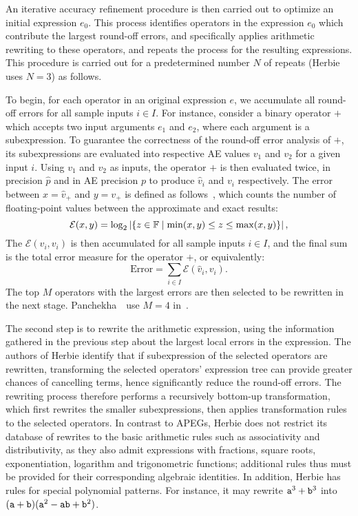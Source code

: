 An iterative accuracy refinement procedure is then carried out to optimize an
initial expression $e_0$.  This process identifies operators in the expression
$e_0$ which contribute the largest round-off errors, and specifically applies
arithmetic rewriting to these operators, and repeats the process for the
resulting expressions.  This procedure is carried out for a predetermined
number $N$ of repeats (Herbie uses $N = 3$) as follows.

To begin, for each operator in an original expression $e$, we accumulate all
round-off errors for all sample inputs $i \in I$.  For instance, consider
a binary operator $+$ which accepts two input arguments $e_1$ and $e_2$,
where each argument is a subexpression.  To guarantee the correctness of
the round-off error analysis of $+$, its subexpressions are evaluated
into respective AE values $v_1$ and $v_2$ for a given input $i$.  Using
$v_1$ and $v_2$ as inputs, the operator $+$ is then evaluated twice,
in precision $\hat{p}$ and in AE precision $p$ to produce $\hat{v}_i$
and $v_i$ respectively.  The error between $x = \hat{v}_+$ and $y =
v_+$ is defined as follows~\cite{panchekha15, schkufza14}, which counts
the number of floating-point values between the approximate and exact
results\footnotemark[4]:
\begin{equation}
    \mathcal{E}(x, y) = \log_2 \left| \left\{
        z \in \mathbb{F} \mid \min(x, y) \leq z \leq \max(x, y)
    \right\} \right|,
\end{equation}
The $\mathcal{E}(\hat{v}_i, v_i)$ is then accumulated for all sample inputs $i
\in I$, and the final sum is the total error measure for the operator $+$, or
equivalently:
\begin{equation}
    \mathrm{Error} = \sum_{i \in I} \mathcal{E}(\hat{v}_i, v_i).
\end{equation}
The top $M$ operators with the largest errors are then selected to be rewritten
in the next stage.  Panchekha~\etal~use $M = 4$ in~\cite{panchekha15}.

The second step is to rewrite the arithmetic expression, using the information
gathered in the previous step about the largest local errors in the expression.
The authors of Herbie identify that if subexpression of the selected operators
are rewritten, transforming the selected operators' expression tree can provide
greater chances of cancelling terms, hence significantly reduce the round-off
errors.  The rewriting process therefore performs a recursively bottom-up
transformation, which first rewrites the smaller subexpressions, then applies
transformation rules to the selected operators.  In contrast to APEGs, Herbie
does not restrict its database of rewrites to the basic arithmetic rules such
as associativity and distributivity, as they also admit expressions with
fractions, square roots, exponentiation, logarithm and trigonometric functions;
additional rules thus must be provided for their corresponding algebraic
identities.  In addition, Herbie has rules for special polynomial patterns.
For instance, it may rewrite $\texttt{a}^3 + \texttt{b}^3$ into $(\texttt{a} + \texttt{b})(\texttt{a}^2
- \texttt{a}\texttt{b} + \texttt{b}^2)$.

